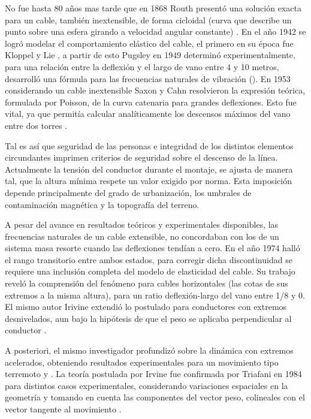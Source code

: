 No fue hasta 80 años mas tarde que en 1868 Routh presentó una solución exacta para un cable, también inextensible, de forma cicloidal (curva que describe un punto sobre una esfera girando a velocidad angular constante) \cite{routh1955dynamics}. En el año 1942 se logró modelar el comportamiento elástico del cable, el primero en su época fue Kloppel y Lie \citep{Kloppel1942}, a partir de esto Pugsley en 1949 determinó experimentalmente, para una relación entre la deflexión y el largo de vano entre 4 y 10 metros, desarrolló una fórmula para las frecuencias naturales de vibración (\cite{Pugsley1949}). En 1953 considerando un cable inextensible Saxon y Cahn resolvieron la expresión teórica, formulada por Poisson, de la curva catenaria para grandes deflexiones. Esto fue vital, ya que permitía calcular analíticamente los descensos máximos del vano entre dos torres \cite{Saxon1953}.

Tal es así que seguridad de las personas e integridad de los distintos elementos circundantes imprimen criterios de seguridad sobre el descenso de la línea. Actualmente la tensión del conductor durante el montaje, se ajusta de manera tal, que la altura mínima respete un valor exigido por norma. Esta imposición depende principalmente del grado de urbanización, los umbrales de contaminación magnética y la topografía del terreno.   

A pesar del avance en resultados teóricos y experimentales disponibles, las frecuencias naturales de un cable extensible, no concordaban con los de un sistema masa resorte cuando las deflexiones tendían a cero. En el año 1974 \cite{Irvine1974} halló el rango transitorio entre ambos estados, para corregir dicha discontinuidad se requiere una inclusión completa del modelo de elasticidad del cable. Su trabajo reveló la comprensión del fenómeno para cables horizontales (las cotas de sus extremos a la misma altura), para un ratio deflexión-largo del vano entre 1/8 y 0. El mismo autor Irivine extendió lo postulado para conductores con extremos desnivelados, aun bajo la hipótesis de que el peso se aplicaba perpendicular al conductor \citep{Irvine1974}.

A posteriori, el mismo investigador profundizó sobre la dinámica con extremos acelerados, obteniendo resultados experimentales para un movimiento tipo terremoto \citep{Irvine1976} y \citep{Irvine1978}. La teoría postulada por Irvine fue confirmada por Triafani en 1984 para distintos casos experimentales,  considerando variaciones espaciales en la geometría y tomando en cuenta las componentes del vector peso, colineales con el vector tangente al movimiento \cite{Triantafyllou1984}.

